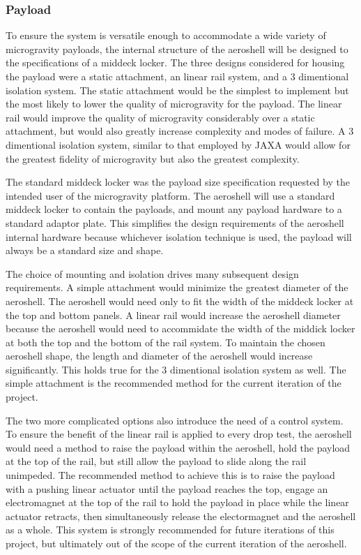 
\subsubsection{Payload}

\indent\indent To ensure the system is versatile enough to accommodate a wide variety of microgravity payloads, the internal structure of the aeroshell will be designed to the specifications of a middeck locker. The three designs considered for housing the payload were a static attachment, an linear rail system, and a 3 dimentional isolation system. The static attachment would be the simplest to implement but the most likely to lower the quality of microgravity for the payload. The linear rail would improve the quality of microgravity considerably over a static attachment, but would also greatly increase complexity and modes of failure. A 3 dimentional isolation system, similar to that employed by JAXA \cite{JAXALabs} would allow for the greatest fidelity of microgravity but also the greatest complexity. 

The standard middeck locker was the payload size specification requested by the intended user of the microgravity platform. The aeroshell will use a standard middeck locker to contain the payloads, and mount any payload hardware to a standard adaptor plate. This simplifies the design requirements of the aeroshell internal hardware because whichever isolation technique is used, the payload will always be a standard size and shape.

The choice of mounting and isolation drives many subsequent design requirements. A simple attachment would minimize the greatest diameter of the aeroshell. The aeroshell would need only to fit the width of the middeck locker at the top and bottom panels. A linear rail would increase the aeroshell diameter because the aeroshell would need to accommidate the width of the middick locker at both the top and the bottom of the rail system. To maintain the chosen aeroshell shape, the length and diameter of the aeroshell would increase significantly. This holds true for the 3 dimentional isolation system as well. The simple attachment is the recommended method for the current iteration of the project.

The two more complicated options also introduce the need of a control system. To ensure the benefit of the linear rail is applied to every drop test, the aeroshell would need a method to raise the payload within the aeroshell, hold the payload at the top of the rail, but still allow the payload to slide along the rail unimpeded. The recommended method to achieve this is to raise the payload with a pushing linear actuator until the payload reaches the top, engage an electromagnet at the top of the rail to hold the payload in place while the linear actuator retracts, then simultaneously release the electormagnet and the aeroshell as a whole. This system is strongly recommended for future iterations of this project, but ultimately out of the scope of the current iteration of the aeroshell.

